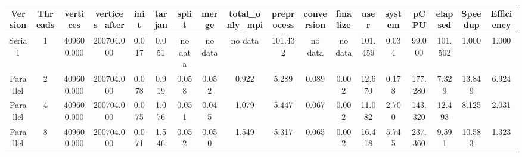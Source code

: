\begin{tabular}{|c|c|c|c|c|c|c|c|c|c|c|c|c|c|c|c|c|c|}
\toprule
 Version &  Threads &   vertices &  vertices\_after &  init &  tarjan &   split &   merge & total\_only\_mpi &  preprocess & conversion & finalize &    user &  system &    pCPU &  elapsed &  Speedup &  Efficiency \\
\midrule
  Serial &        1 & 409600.000 &      200704.000 & 0.017 &   0.051 & no data & no data &        no data &     101.432 &    no data &  no data & 101.459 &   0.034 &  99.000 &  101.502 &    1.000 &       1.000 \\
Parallel &        2 & 409600.000 &      200704.000 & 0.078 &   0.919 &   0.058 &   0.052 &          0.922 &       5.289 &      0.089 &    0.002 &  12.670 &   0.178 & 177.280 &    7.329 &   13.849 &       6.924 \\
Parallel &        4 & 409600.000 &      200704.000 & 0.075 &   1.076 &   0.051 &   0.045 &          1.079 &       5.447 &      0.067 &    0.002 &  11.082 &   2.700 & 143.320 &   12.493 &    8.125 &       2.031 \\
Parallel &        8 & 409600.000 &      200704.000 & 0.071 &   1.546 &   0.052 &   0.050 &          1.549 &       5.317 &      0.065 &    0.002 &  16.418 &   5.745 & 237.360 &    9.591 &   10.583 &       1.323 \\
\bottomrule
\end{tabular}
